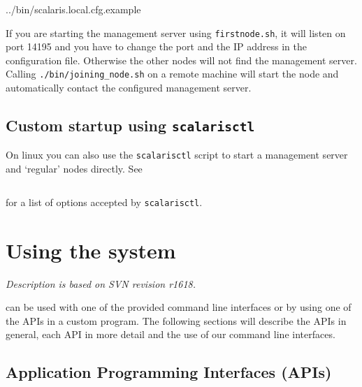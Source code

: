 \documentclass[a4paper]{scrreprt}
\newcommand{\codesnippet}[4][language=erlang]{
{%
\lstset{numbers=left}

{#4}
}
}
\newcommand{\code}[1]{\lstinline[basicstyle=\ttfamily]!#1!}
\newcommand{\filetitle}[1]{\hbox to \linewidth{~~File \code{#1:}\hfill}}
\newcommand{\svnrev}[1]
{\hfill\emph{Description is based on SVN revision #1.}\medskip}
\begin{document}
\codesnippet{scalaris.local.cfg}{local_cfg:distributed}{../bin/scalaris.local.cfg.example}

If you are starting the management server using \code{firstnode.sh}, it will
listen on port 14195 and you have to change the port and the IP address in the
configuration file. Otherwise the other nodes will not find the management
server. Calling \code{./bin/joining_node.sh} on a remote machine will start the
node and automatically contact the configured management server.




\section{Custom startup using \code{scalarisctl}}

On linux you can also use the \code{scalarisctl} script to start a
management server and `regular' nodes directly. See
\begin{lstlisting}[language=sh]
%> ./bin/scalarisctl -h
\end{lstlisting}
for a list of options accepted by \code{scalarisctl}.

\chapter{Using the system}
\label{chapter.systemuse}
\svnrev{r1618}

\scalaris{} can be used with one of the provided command line interfaces or
by using one of the APIs in a custom program. The following sections will
describe the APIs in general, each API in more detail and the use of our
command line interfaces.

\section{Application Programming Interfaces (APIs)}
\label{chapter.systemuse.apis}
\end{document}
